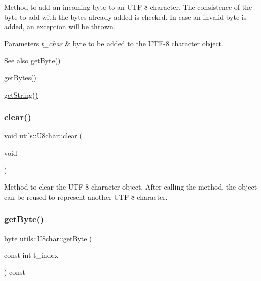 Method to add an incoming byte to an U\+T\+F-\/8 character. The consistence of the byte to add with the bytes already added is checked. In case an invalid byte is added, an exception will be thrown. 
\begin{DoxyParams}{Parameters}
{\em t\+\_\+char} & byte to be added to the U\+T\+F-\/8 character object. \\
\hline
\end{DoxyParams}
\begin{DoxySeeAlso}{See also}
\hyperlink{classutils_1_1U8char_af23db23219f81cfcc9424a7dbde981d9}{get\+Byte()} 

\hyperlink{classutils_1_1U8char_a9bf39a597d04b56faac3325eebf49b39}{get\+Bytes()} 

\hyperlink{classutils_1_1U8char_a234c21cc7b616c9d5f249badf1ba33b2}{get\+String()} 
\end{DoxySeeAlso}
\mbox{\label{classutils_1_1U8char_a682d09b6d41f3127f9da3be977aba230}} 
\subsubsection{\texorpdfstring{clear()}{clear()}}
{\footnotesize\ttfamily void utils\+::\+U8char\+::clear (\begin{DoxyParamCaption}\item[{void}]{ }\end{DoxyParamCaption})}

Method to clear the U\+T\+F-\/8 character object. After calling the method, the object can be reused to represent another U\+T\+F-\/8 character. \mbox{\label{classutils_1_1U8char_af23db23219f81cfcc9424a7dbde981d9}} 
\subsubsection{\texorpdfstring{get\+Byte()}{getByte()}}
{\footnotesize\ttfamily \hyperlink{namespaceutils_a6ec9293c5f79998946269edb0f6bc028}{byte} utils\+::\+U8char\+::get\+Byte (\begin{DoxyParamCaption}\item[{const int}]{t\+\_\+index }\end{DoxyParamCaption}) const}


